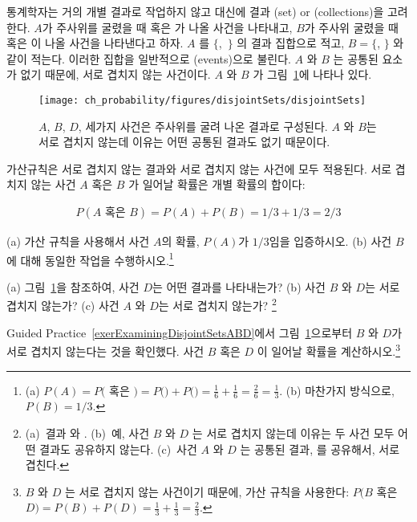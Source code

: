 통계학자는 거의 개별 결과로 작업하지 않고 대신에 결과 (set) or (collections)을 고려한다. $A$가 주사위를 굴렸을 때  혹은 가 나올 사건을 나타내고, $B$가 주사위 굴렸을 때  혹은  이 나올 사건을 나타낸다고 하자. $A$ 를 $\{$,~$\}$ 의 결과 집합으로 적고, $B=\{$, $\}$ 와 같이 적는다. 이러한 집합을 일반적으로 (events)으로 불린다. $A$ 와 $B$ 는 공통된 요소가 없기 때문에, 서로 겹치지 않는 사건이다. $A$ 와 $B$ 가 그림~\ref{disjointSets}에 나타나 있다.

\begin{figure}[hhh]
\centering
\texttt{[image: ch\_probability/figures/disjointSets/disjointSets]}
\caption{$A$, $B$, $D$, 세가지 사건은 주사위를 굴려 나온 결과로 구성된다. $A$ 와 $B$는 서로 겹치지 않는데 이유는 어떤 공통된 결과도 없기 때문이다.}
\label{disjointSets}
\end{figure}

가산규칙은 서로 겹치지 않는 결과와 서로 겹치지 않는 사건에 모두 적용된다. 서로 겹치지 않는 사건 $A$ 혹은 $B$ 가 일어날 확률은 개별 확률의 합이다:

\begin{align*}
P(A\text{ 혹은 }B) = P(A) + P(B) = 1/3 + 1/3 = 2/3
\end{align*}

\begin{exercise}
(a) 가산 규칙을 사용해서 사건 $A$의 확률, $P(A)$가 $1/3$임을 입증하시오. (b) 사건 $B$에 대해 동일한 작업을 수행하시오.\footnote{(a) $P(A) = P($ 혹은 $) = P($$) + P($$) = \frac{1}{6} + \frac{1}{6} = \frac{2}{6} = \frac{1}{3}$. (b) 마찬가지 방식으로, $P(B) = 1/3$.}
\end{exercise}

\begin{exercise} \label{exerExaminingDisjointSetsABD}
(a) 그림~\ref{disjointSets}을 참조하여, 사건 $D$는 어떤 결과를 나타내는가? (b) 사건 $B$ 와 $D$는 서로 겹치지 않는가? (c) 사건 $A$ 와 $D$는 서로 겹치지 않는가? \footnote{(a)~결과  와 . (b)~예, 사건 $B$ 와 $D$ 는 서로 겹치지 않는데 이유는 두 사건 모두 어떤 결과도 공유하지 않는다. (c)~사건 $A$ 와 $D$ 는 공통된 결과, 를 공유해서, 서로 겹친다.}
\end{exercise}

\begin{exercise}
Guided Practice~\ref{exerExaminingDisjointSetsABD}에서 그림~\ref{disjointSets}으로부터 $B$ 와 $D$가 서로 겹치지 않는다는 것을 확인했다. 사건 $B$ 혹은 $D$ 이 일어날 확률을 계산하시오.\footnote{$B$ 와 $D$ 는 서로 겹치지 않는 사건이기 때문에, 가산 규칙을 사용한다: $P(B$ 혹은 $D) = P(B) + P(D) = \frac{1}{3} + \frac{1}{3} = \frac{2}{3}$.}
\end{exercise}

